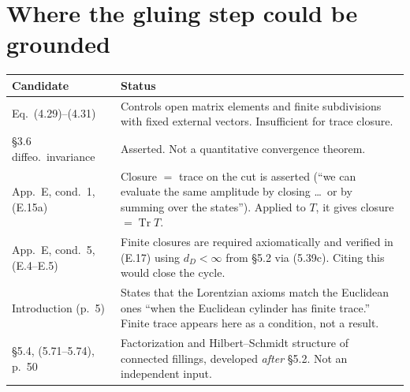 \documentclass[11pt]{article}
\theoremstyle{remark}
\newcommand{\Tr}{\operatorname{Tr}}
\begin{document}
\section{Where the gluing step could be grounded}
\begin{center}
\begin{tabular}{p{}p{}}
\hline
Candidate & Status\\\hline
Eq.~(4.29)--(4.31) & Controls open matrix elements and finite subdivisions with fixed external vectors. Insufficient for trace closure.\\
\S3.6 diffeo.\ invariance & Asserted. Not a quantitative convergence theorem.\\
App.~E, cond.~1, (E.15a) & Closure $=$ trace on the cut is asserted (``we can evaluate the same amplitude by closing \ldots\ or by summing over the states''). Applied to $T$, it gives closure $=\Tr T$.\\
App.~E, cond.~5, (E.4--E.5) & Finite closures are required axiomatically and verified in (E.17) using $d_D<\infty$ from \S5.2 via (5.39c). Citing this would close the cycle.\\
Introduction (p.~5) & States that the Lorentzian axioms match the Euclidean ones ``when the Euclidean cylinder has finite trace.'' Finite trace appears here as a condition, not a result.\\
\S5.4, (5.71--5.74), p.~50 & Factorization and Hilbert--Schmidt structure of connected fillings, developed \emph{after} \S5.2. Not an independent input.\\
\hline
\end{tabular}
\end{center}
\end{document}
